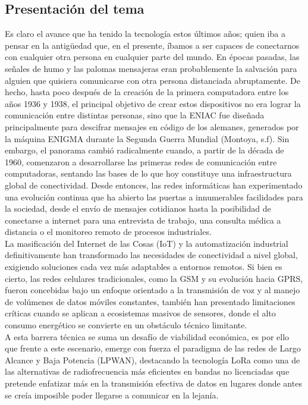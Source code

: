 \documentclass[12pt,a4paper]{article}
\begin{document}
	\subsection{Presentación del tema}
	Es claro el avance que ha tenido la tecnología estos últimos años; quien iba a pensar en la antigüedad que, en el presente, íbamos a ser capaces de conectarnos con cualquier otra persona en cualquier parte del mundo. En épocas pasadas, las señales de humo y las palomas mensajeras eran probablemente la salvación para alguien que quisiera comunicarse con otra persona distanciada abruptamente. De hecho, hasta poco después de la creación de la primera computadora entre los años 1936 y 1938, el principal objetivo de crear estos dispositivos no era lograr la comunicación entre distintas personas, sino que la ENIAC fue diseñada principalmente para descifrar mensajes en código de los alemanes, generados por la máquina ENIGMA durante la Segunda Guerra Mundial (Montoya, s.f). Sin embargo, el panorama cambió radicalmente cuando, a partir de la década de 1960, comenzaron a desarrollarse las primeras redes de comunicación entre computadoras, sentando las bases de lo que hoy constituye una infraestructura global de conectividad. Desde entonces, las redes informáticas han experimentado una evolución continua que ha abierto las puertas a innumerables facilidades para la sociedad, desde el envío de mensajes cotidianos hasta la posibilidad de conectarse a internet para una entrevista de trabajo, una consulta médica a distancia o el monitoreo remoto de procesos industriales.\\
	
	La masificación del Internet de las Cosas (IoT) y la automatización industrial definitivamente han transformado las necesidades de conectividad a nivel global, exigiendo soluciones cada vez más adaptables a entornos remotos. Si bien es cierto, las redes celulares tradicionales, como la GSM y su evolución hacia GPRS, fueron concebidas bajo un enfoque orientado a la transmisión de voz y al manejo de volúmenes de datos móviles constantes, también han presentado limitaciones críticas cuando se aplican a ecosistemas masivos de sensores, donde el alto consumo energético se convierte en un obstáculo técnico limitante.\\
	
	A esta barrera técnica se suma un desafío de viabilidad económica, es por ello que frente a este escenario, emerge con fuerza el paradigma de las redes de Largo Alcance y Baja Potencia (LPWAN), destacando la tecnología LoRa como una de las alternativas de radiofrecuencia más eficientes en bandas no licenciadas que pretende enfatizar más en la transmisión efectiva de datos en lugares donde antes se creía imposible poder llegarse a comunicar en la lejanía.
	
\end{document}
